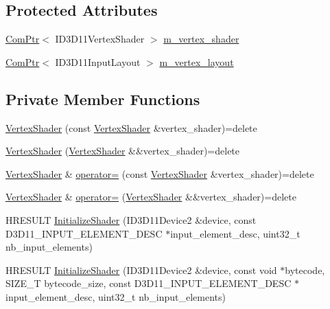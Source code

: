 \subsection*{Protected Attributes}
\begin{DoxyCompactItemize}
\item 
\hyperlink{namespacemage_ae74f374780900893caa5555d1031fd79}{Com\+Ptr}$<$ I\+D3\+D11\+Vertex\+Shader $>$ \hyperlink{classmage_1_1_vertex_shader_a0b2b02abae4cb226c115d7f1c5464a54}{m\+\_\+vertex\+\_\+shader}
\item 
\hyperlink{namespacemage_ae74f374780900893caa5555d1031fd79}{Com\+Ptr}$<$ I\+D3\+D11\+Input\+Layout $>$ \hyperlink{classmage_1_1_vertex_shader_a9b9895650b8c7f80af846d75f7d9ddda}{m\+\_\+vertex\+\_\+layout}
\end{DoxyCompactItemize}
\subsection*{Private Member Functions}
\begin{DoxyCompactItemize}
\item 
\hyperlink{classmage_1_1_vertex_shader_a713f8581278ea2e5eb3010207b7e42a8}{Vertex\+Shader} (const \hyperlink{classmage_1_1_vertex_shader}{Vertex\+Shader} \&vertex\+\_\+shader)=delete
\item 
\hyperlink{classmage_1_1_vertex_shader_ad3bd5ca377ec161cdb670753774ede5c}{Vertex\+Shader} (\hyperlink{classmage_1_1_vertex_shader}{Vertex\+Shader} \&\&vertex\+\_\+shader)=delete
\item 
\hyperlink{classmage_1_1_vertex_shader}{Vertex\+Shader} \& \hyperlink{classmage_1_1_vertex_shader_a0094f5c2adb8377fa5c8d52e7a65136f}{operator=} (const \hyperlink{classmage_1_1_vertex_shader}{Vertex\+Shader} \&vertex\+\_\+shader)=delete
\item 
\hyperlink{classmage_1_1_vertex_shader}{Vertex\+Shader} \& \hyperlink{classmage_1_1_vertex_shader_ada6250a89610e5649e0062c9a50fb78a}{operator=} (\hyperlink{classmage_1_1_vertex_shader}{Vertex\+Shader} \&\&vertex\+\_\+shader)=delete
\item 
H\+R\+E\+S\+U\+LT \hyperlink{classmage_1_1_vertex_shader_afe85ee7cdaba3ce17a1d461bd633be97}{Initialize\+Shader} (I\+D3\+D11\+Device2 \&device, const D3\+D11\+\_\+\+I\+N\+P\+U\+T\+\_\+\+E\+L\+E\+M\+E\+N\+T\+\_\+\+D\+E\+SC $\ast$input\+\_\+element\+\_\+desc, uint32\+\_\+t nb\+\_\+input\+\_\+elements)
\item 
H\+R\+E\+S\+U\+LT \hyperlink{classmage_1_1_vertex_shader_ab2481ea7e51cd41e74cf1394f14f43e1}{Initialize\+Shader} (I\+D3\+D11\+Device2 \&device, const void $\ast$bytecode, S\+I\+Z\+E\+\_\+T bytecode\+\_\+size, const D3\+D11\+\_\+\+I\+N\+P\+U\+T\+\_\+\+E\+L\+E\+M\+E\+N\+T\+\_\+\+D\+E\+SC $\ast$input\+\_\+element\+\_\+desc, uint32\+\_\+t nb\+\_\+input\+\_\+elements)
\end{DoxyCompactItemize}


